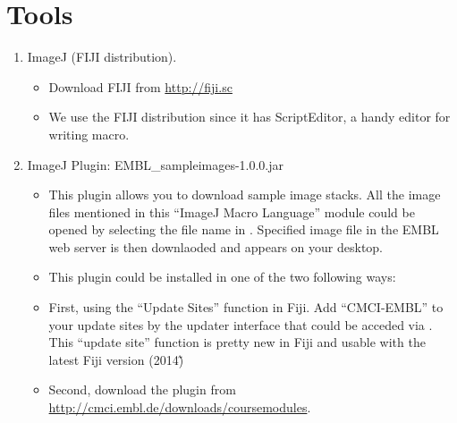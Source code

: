 \section{Tools}
\label{sec:tools}

\begin{enumerate}
  \item ImageJ (FIJI distribution).

\begin{itemize}
    \item Download FIJI from \url{http://fiji.sc}
    \item We use the FIJI distribution since it has ScriptEditor, a handy editor for writing macro. 
  
\end{itemize}
  \item ImageJ Plugin: EMBL\_sampleimages-1.0.0.jar

\begin{itemize}
     \item This plugin allows you to download sample image stacks. All the image files mentioned in this ``ImageJ Macro Language'' module could be opened by selecting the file name in . Specified image file in the EMBL web server is then downlaoded and appears on your desktop.
    \item This plugin could be installed in one of the two following ways:
    \item First, using the ``Update Sites'' function in Fiji. Add ``CMCI-EMBL'' to your update sites by the updater interface that could be acceded via . This ``update site'' function is pretty new in Fiji and usable with the latest Fiji version (2014\~)        
    \item Second, download the plugin from \url{http://cmci.embl.de/downloads/coursemodules}. 
  
\end{itemize}

\end{enumerate}
 
\newpage